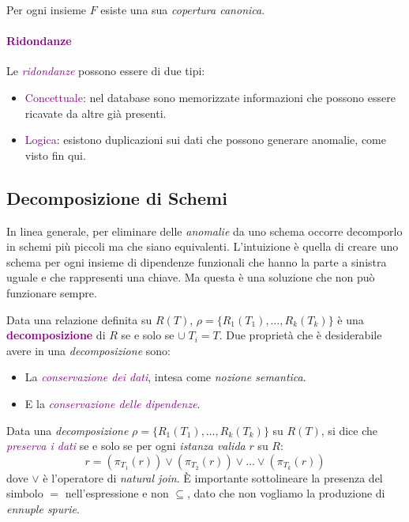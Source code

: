 \begin{theorem}
    Per ogni insieme $F$ esiste una sua \emph{copertura canonica}.
\end{theorem}

\paragraph{\textcolor{purple}{Ridondanze}} Le \emph{\textcolor{purple}{ridondanze}} possono essere di due tipi:
\begin{itemize}
    \item \textcolor{purple}{Concettuale}: nel database sono memorizzate informazioni che possono essere ricavate
        da altre già presenti.
    \item \textcolor{purple}{Logica}: esistono duplicazioni sui dati che possono generare anomalie, come visto fin qui.
\end{itemize}

\subsection{Decomposizione di Schemi}

In linea generale, per eliminare delle \emph{anomalie} da uno schema occorre decomporlo in schemi più piccoli ma che
siano equivalenti. L'intuizione è quella di creare uno schema per ogni insieme di dipendenze funzionali che hanno la parte
a sinistra uguale e che rappresenti una chiave. Ma questa è una soluzione che non può funzionare sempre.

\begin{definition}[Decomposizione]
    Data una relazione definita su $R(T)$, $\rho = \{R_1(T_1), \dots, R_k(T_k)\}$ è una
    \textbf{\textcolor{purple}{decomposizione}} di $R$ se e solo se $\cup \; T_i = T$.
    Due proprietà che è desiderabile avere in una \emph{decomposizione} sono:
    \begin{itemize}
        \item La \emph{\textcolor{purple}{conservazione dei dati}}, intesa come \emph{nozione semantica}.
        \item E la \emph{\textcolor{purple}{conservazione delle dipendenze}}.
    \end{itemize}
\end{definition}

\begin{definition}
    Data una \emph{decomposizione} $\rho = \{R_1(T_1), \dots, R_k(T_k)\}$ su $R(T)$, si dice
    che \emph{\textcolor{purple}{preserva i dati}} se e solo se per ogni \emph{istanza valida} $r$ su $R$:
    \begin{equation*}
        r = (\pi_{T_1}(r)) \vee (\pi_{T_2}(r)) \vee \dots \vee (\pi_{T_k}(r))
    \end{equation*}
    dove $\vee$ è l'operatore di \emph{natural join}. È importante sottolineare la presenza
    del simbolo $=$ nell'espressione e non $\subseteq$, dato che non vogliamo la produzione di \emph{ennuple spurie}.
\end{definition}

